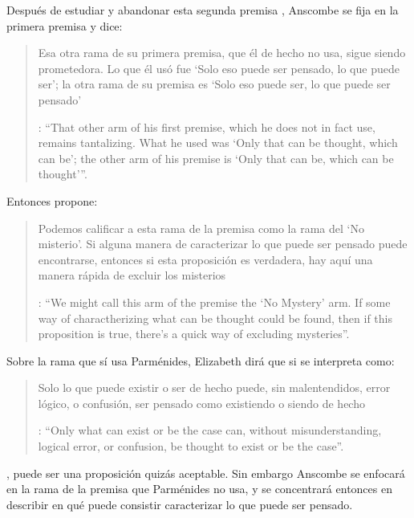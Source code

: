 Después de estudiar y abandonar esta segunda premisa , Anscombe se fija en la primera premisa y dice: \blockquote[{\Cite[5]{anscombe1981parmenides:pmc}}: \enquote{That other arm of his first premise, which he does not in fact use, remains tantalizing. What he used was `Only that can be thought, which can be'; the other arm of his premise is `Only that can be, which can be thought'}.]{Esa otra rama de su primera premisa, que él de hecho no usa, sigue siendo prometedora. Lo que él usó fue `Solo eso puede ser pensado, lo que puede ser'; la otra rama de su premisa es `Solo eso puede ser, lo que puede ser pensado'}. Entonces propone: \blockquote[{\Cite[5]{anscombe1981parmenides:pmc}}: \enquote{We might call this arm of the premise the `No Mystery' arm. If some way of charactherizing what can be thought could be found, then if this proposition is true, there's a quick way of excluding mysteries}.]{Podemos calificar a esta rama de la premisa como la rama del `No misterio'. Si alguna manera de caracterizar lo que puede ser pensado puede encontrarse, entonces si esta proposición es verdadera, hay aquí una manera rápida de excluir los misterios}. Sobre la rama que sí usa Parménides, Elizabeth dirá que si se interpreta como: \blockquote[{\Cite[6]{anscombe1981parmenides:pmc}}: \enquote{Only what can exist or be the case can, without misunderstanding, logical error, or confusion, be thought to exist or be the case}.]{Solo lo que puede existir o ser de hecho puede, sin malentendidos, error lógico, o confusión, ser pensado como existiendo o siendo de hecho}, puede ser una proposición quizás aceptable. Sin embargo Anscombe se enfocará en la rama de la premisa que Parménides no usa, y se concentrará entonces en describir en qué puede consistir caracterizar lo que puede ser pensado.

